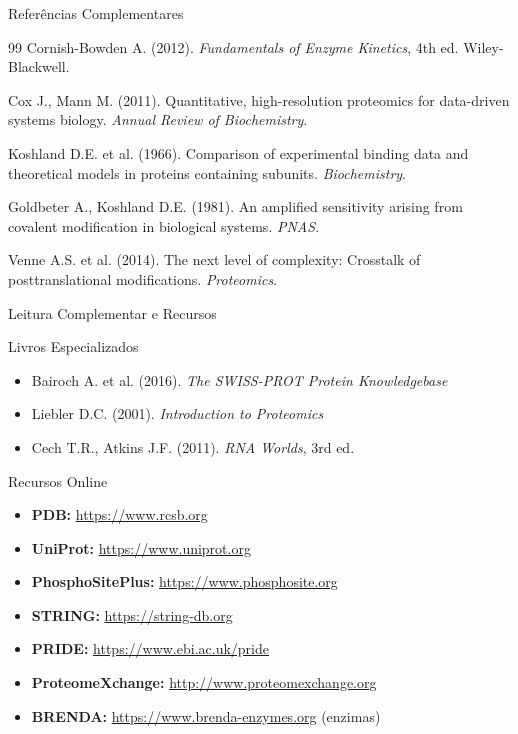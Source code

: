 \begin{frame}[allowframebreaks]{Referências Complementares}
\begin{thebibliography}{99}
 Cornish-Bowden A. (2012). \textit{Fundamentals of Enzyme Kinetics}, 4th ed. Wiley-Blackwell.

 Cox J., Mann M. (2011). Quantitative, high-resolution proteomics for data-driven systems biology. \textit{Annual Review of Biochemistry}.

 Koshland D.E. et al. (1966). Comparison of experimental binding data and theoretical models in proteins containing subunits. \textit{Biochemistry}.

 Goldbeter A., Koshland D.E. (1981). An amplified sensitivity arising from covalent modification in biological systems. \textit{PNAS}.

 Venne A.S. et al. (2014). The next level of complexity: Crosstalk of posttranslational modifications. \textit{Proteomics}.
\end{thebibliography}
\end{frame}

\begin{frame}[allowframebreaks]{Leitura Complementar e Recursos}
\begin{block}{Livros Especializados}
\begin{itemize}
    \item Bairoch A. et al. (2016). \textit{The SWISS-PROT Protein Knowledgebase}
    \item Liebler D.C. (2001). \textit{Introduction to Proteomics}
    \item Cech T.R., Atkins J.F. (2011). \textit{RNA Worlds}, 3rd ed.
\end{itemize}
\end{block}

\begin{block}{Recursos Online}
\begin{itemize}
    \item \textbf{PDB:} \url{https://www.rcsb.org}
    \item \textbf{UniProt:} \url{https://www.uniprot.org}
    \item \textbf{PhosphoSitePlus:} \url{https://www.phosphosite.org}
    \item \textbf{STRING:} \url{https://string-db.org}
    \item \textbf{PRIDE:} \url{https://www.ebi.ac.uk/pride}
    \item \textbf{ProteomeXchange:} \url{http://www.proteomexchange.org}
    \item \textbf{BRENDA:} \url{https://www.brenda-enzymes.org} (enzimas)
\end{itemize}
\end{block}
\end{frame}

